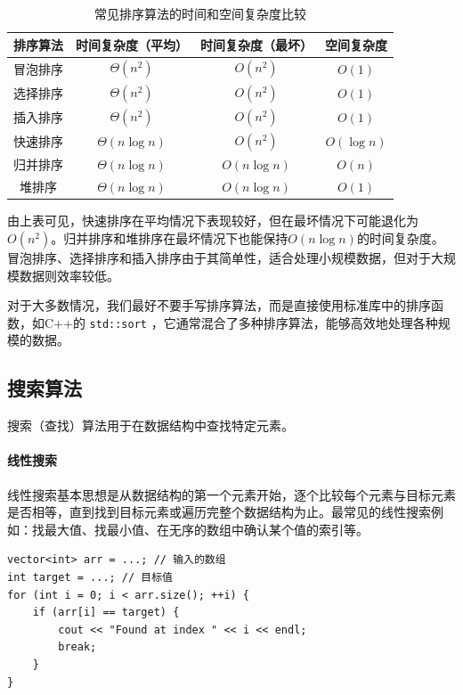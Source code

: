 \begin{table}[ht]
    \centering
    \begin{tabular}{c|ccc}
        \hline
        排序算法 & 时间复杂度（平均） & 时间复杂度（最坏） & 空间复杂度 \\
        \hline
        冒泡排序 & $\Theta(n^2)$ & $O(n^2)$ & $O(1)$ \\
        选择排序 & $\Theta(n^2)$ & $O(n^2)$ & $O(1)$ \\
        插入排序 & $\Theta(n^2)$ & $O(n^2)$ & $O(1)$ \\
        快速排序 & $\Theta(n \log n)$ & $O(n^2)$ & $O(\log n)$ \\
        归并排序 & $\Theta(n \log n)$ & $O(n \log n)$ & $O(n)$ \\
        堆排序 & $\Theta(n \log n)$ & $O(n \log n)$ & $O(1)$ \\
        \hline
    \end{tabular}
    \caption{常见排序算法的时间和空间复杂度比较}
\end{table}

由上表可见，快速排序在平均情况下表现较好，但在最坏情况下可能退化为$O(n^2)$。归并排序和堆排序在最坏情况下也能保持$O(n \log n)$的时间复杂度。冒泡排序、选择排序和插入排序由于其简单性，适合处理小规模数据，但对于大规模数据则效率较低。

对于大多数情况，我们最好不要手写排序算法，而是直接使用标准库中的排序函数，如C++的 \texttt{std::sort} ，它通常混合了多种排序算法，能够高效地处理各种规模的数据。

\subsection{搜索算法}

搜索（查找）算法用于在数据结构中查找特定元素。

\paragraph{线性搜索} 线性搜索基本思想是从数据结构的第一个元素开始，逐个比较每个元素与目标元素是否相等，直到找到目标元素或遍历完整个数据结构为止。最常见的线性搜索例如：找最大值、找最小值、在无序的数组中确认某个值的索引等。

\begin{verbatim}
vector<int> arr = ...; // 输入的数组
int target = ...; // 目标值
for (int i = 0; i < arr.size(); ++i) {
    if (arr[i] == target) {
        cout << "Found at index " << i << endl;
        break;
    }
}
\end{verbatim}


